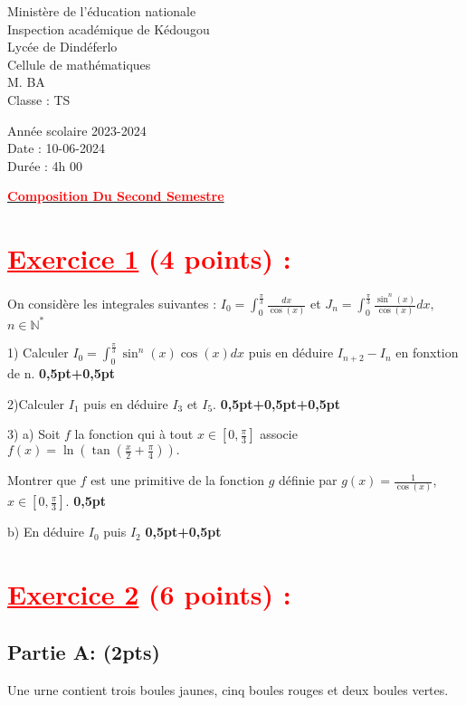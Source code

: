 \documentclass[12pt]{article}
\begin{document}
\begin{minipage}{0.5\textwidth}
	Ministère de l'éducation nationale  \\
	Inspection académique de Kédougou   \\
	Lycée de Dindéferlo            \\
	Cellule de mathématiques            \\
	M. BA                          \\
	Classe : TS  \\
\end{minipage}
\begin{minipage}{0.5\textwidth}
	Année scolaire 2023-2024 \\
	Date : 10-06-2024 \\
	Durée : 4h 00 \\
\end{minipage}

\begin{center}
	\textbf{{\underline{\textcolor{red}{Composition Du Second Semestre}}}}
\end{center}

\section*{\textcolor{red}{\underline{Exercice 1} (4 points) :}}
On considère les integrales suivantes : $I_{0}=\int_{0}^{\frac{\pi}{3}}\frac{dx}{\cos (x)}$ et $J_{n}=\int_{0}^{\frac{\pi}{3}}\frac{\sin^{n}(x)}{\cos(x)}dx,$ $n\in\mathbb{N}^{*}$

1) Calculer $I_{0}=\int_{0}^{\frac{\pi}{3}}\sin^{n}(x)\cos(x)dx$  puis en déduire $I_{n+2}-I_{n}$ en fonxtion de  n. \textbf{0,5pt+0,5pt}

2)Calculer $I_{1}$ puis en déduire $I_{3}$ et $I_{5}$. \textbf{0,5pt+0,5pt+0,5pt}

3) a) Soit $f$ la fonction qui à tout $x\in\left[0, \frac{\pi}{3}\right]$ associe $f(x)=\ln\left( \tan\left(\frac{x}{2}+\frac{\pi}{4}\right)\right) .$ 

Montrer que  $f$ est une primitive de la fonction $g$ définie par $g(x)=\frac{1}{\cos(x)}$, $x\in\left[0, \frac{\pi}{3}\right]$. \textbf{0,5pt}

b) En déduire $I_{0}$ puis $I_{2}$ \textbf{0,5pt+0,5pt}
\section*{\textcolor{red}{\underline{Exercice 2} (6 points) :}}
\subsection*{Partie A: (2pts)}
Une urne contient trois boules jaunes, cinq boules rouges et deux boules vertes.
\end{document}
